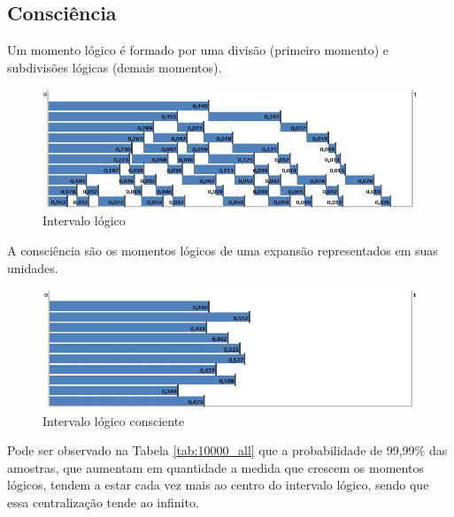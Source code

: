 \subsection{Consciência}
Um momento lógico é formado por uma divisão (primeiro momento) e subdivisões lógicas (demais momentos).
\begin{figure}[H]
\caption{Intervalo lógico}
\label{fig:consciousness_logical_moments}
\centering
\includegraphics[scale=.7]{sections/images/consciousness_logical_moments.jpg}
\end{figure}

A consciência são os momentos lógicos de uma expansão representados em suas unidades.

\begin{figure}[H]
\caption{Intervalo lógico consciente}
\label{fig:consciousness}
\centering
\includegraphics[scale=.7]{sections/images/consciousness.jpg}
\end{figure}

Pode ser observado na Tabela \ref{tab:10000_all} que a probabilidade de 99,99\% das amostras, que aumentam em quantidade a medida que crescem os momentos lógicos, tendem a estar cada vez mais ao centro do intervalo lógico, sendo que essa centralização tende ao infinito.

